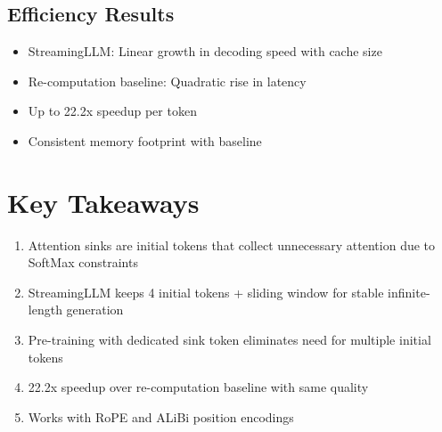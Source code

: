 \subsection{Efficiency Results}
\begin{itemize}
\item StreamingLLM: Linear growth in decoding speed with cache size
\item Re-computation baseline: Quadratic rise in latency
\item Up to 22.2x speedup per token
\item Consistent memory footprint with baseline
\end{itemize}

\section{Key Takeaways}
\begin{enumerate}
\item Attention sinks are initial tokens that collect unnecessary attention due to SoftMax constraints
\item StreamingLLM keeps 4 initial tokens + sliding window for stable infinite-length generation
\item Pre-training with dedicated sink token eliminates need for multiple initial tokens
\item 22.2x speedup over re-computation baseline with same quality
\item Works with RoPE and ALiBi position encodings
\end{enumerate}
